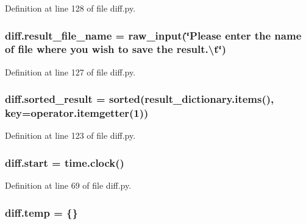 Definition at line 128 of file diff.\+py.

\subsubsection[{\texorpdfstring{result\+\_\+file\+\_\+name}{result_file_name}}]{\setlength{\rightskip}{0pt plus 5cm}diff.\+result\+\_\+file\+\_\+name = raw\+\_\+input(\char`\"{}Please enter the name of {\bf file} where you wish to save the result.\textbackslash{}t\char`\"{})}\hypertarget{namespacediff_a15a863df81a6f3099b088f9f52808389}{}\label{namespacediff_a15a863df81a6f3099b088f9f52808389}


Definition at line 127 of file diff.\+py.

\subsubsection[{\texorpdfstring{sorted\+\_\+result}{sorted_result}}]{\setlength{\rightskip}{0pt plus 5cm}diff.\+sorted\+\_\+result = sorted(result\+\_\+dictionary.\+items(), key=operator.\+itemgetter(1))}\hypertarget{namespacediff_a3b4c2771da02846b61219801d8016b40}{}\label{namespacediff_a3b4c2771da02846b61219801d8016b40}


Definition at line 123 of file diff.\+py.

\subsubsection[{\texorpdfstring{start}{start}}]{\setlength{\rightskip}{0pt plus 5cm}diff.\+start = time.\+clock()}\hypertarget{namespacediff_ac1dbbabcf481dbdd8253f435c6841b59}{}\label{namespacediff_ac1dbbabcf481dbdd8253f435c6841b59}


Definition at line 69 of file diff.\+py.

\subsubsection[{\texorpdfstring{temp}{temp}}]{\setlength{\rightskip}{0pt plus 5cm}diff.\+temp = \{\}}\hypertarget{namespacediff_a9b7319edd5fe67e6804984652b758844}{}\label{namespacediff_a9b7319edd5fe67e6804984652b758844}


